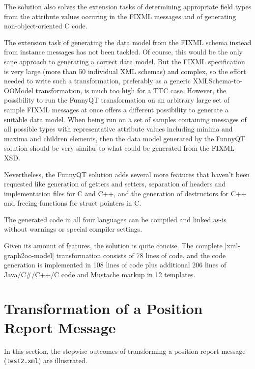 \documentclass[a4paper]{article}
\newcommand{\code}{\clojureinline}
\begin{document}
The solution also solves the extension tasks of determining appropriate field
types from the attribute values occuring in the FIXML messages and of
generating non-object-oriented C code.

The extension task of generating the data model from the FIXML schema instead
from instance messages has not been tackled.  Of course, this would be the only
sane approach to generating a correct data model.  But the FIXML specification
is very large (more than 50 individual XML schemas) and complex, so the effort
needed to write such a transformation, preferably as a generic
XMLSchema-to-OOModel transformation, is much too high for a TTC case.  However,
the possibility to run the FunnyQT transformation on an arbitrary large set of
sample FIXML messages at once offers a different possibility to generate a
suitable data model.  When being run on a set of samples containing messages of
all possible types with representative attribute values including minima and
maxima and children elements, then the data model generated by the FunnyQT
solution should be very similar to what could be generated from the FIXML XSD.

Nevertheless, the FunnyQT solution adds several more features that haven't been
requested like generation of getters and setters, separation of headers and
implementation files for C and C++, and the generation of destructors for C++
and freeing functions for struct pointers in C.

The generated code in all four languages can be compiled and linked as-is
without warnings or special compiler settings.

Given its amount of features, the solution is quite concise.  The complete
\code|xml-graph2oo-model| transformation consists of 78 lines of code, and the
code generation is implemented in 108 lines of code plus additional 206 lines
of Java/C\#/C++/C code and Mustache markup in 12 templates.







\newpage
\appendix

\section{Transformation of a Position Report Message}
\label{sec:posrpt}

In this section, the stepwise outcomes of transforming a position report
message (\texttt{test2.xml}) are illustrated.
\end{document}

